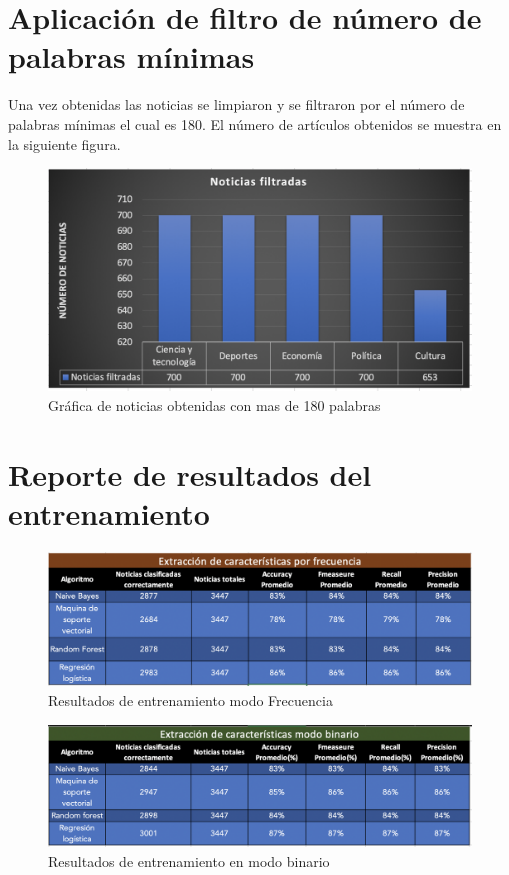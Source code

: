 \section{Aplicación de filtro de número de palabras mínimas}

Una vez obtenidas las noticias se limpiaron y se filtraron por el número de palabras mínimas el cual es 180. El número de artículos  obtenidos se muestra en la siguiente figura.

\begin{figure}[h]
\centering
\includegraphics[scale=0.35]{imagenes/Resultados/Filtrado.png}
\caption{Gráfica de noticias obtenidas con mas de 180 palabras}
\label{fig:filtro}
\end{figure}



\section{Reporte de resultados del entrenamiento}


\begin{figure}[h]
\centering
\includegraphics[scale=0.35]{imagenes/Resultados/MatrizFrecuencia.png}
\caption{Resultados de entrenamiento modo Frecuencia}
\label{fig:matrizfrecuencia}
\end{figure}

\begin{figure}[h]
\centering
\includegraphics[scale=0.35]{imagenes/Resultados/MatrizBinario.png}
\caption{Resultados de entrenamiento en modo binario}
\label{fig:matrizbinario}
\end{figure}